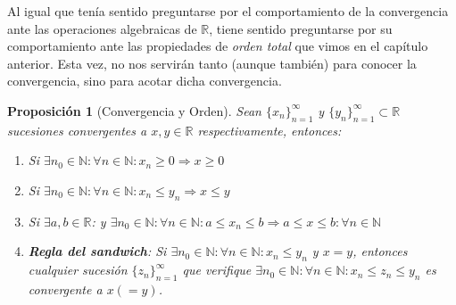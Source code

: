 \documentclass[10pt,a4paper,openright]{book}
\theoremstyle{break}
\newtheorem{prop}{Proposición}[chapter]
\begin{document}
Al igual que tenía sentido preguntarse por el comportamiento de la convergencia ante las operaciones algebraicas de $\mathbb{R}$, tiene sentido preguntarse por su comportamiento ante las propiedades de \textit{orden total} que vimos en el capítulo anterior. Esta vez, no nos servirán tanto (aunque también) para conocer la convergencia, sino para acotar dicha convergencia. 

\begin{prop}[Convergencia y Orden]
Sean $\{x_n\}_{n=1}^\infty$ y $\{y_n\}_{n=1}^\infty\subset \mathbb R$ sucesiones convergentes a $x,y\in \mathbb R$ respectivamente, entonces:
\begin{enumerate}
\item Si $\exists n_0 \in \mathbb{N}: \forall n\in \mathbb{N}: x_n\geq 0 \Rightarrow x\geq 0$
\item Si $\exists n_0 \in \mathbb{N}: \forall n\in \mathbb{N}: x_n\leq y_n \Rightarrow x\leq y$
\item Si $\exists a,b\in \mathbb R$: y $\exists n_0 \in \mathbb{N}: \forall n\in \mathbb{N}: a\leq x_n\leq b\Rightarrow a\leq x\leq b: \forall n \in \mathbb N$
\item \textbf{Regla del sandwich}: Si $\exists n_0 \in \mathbb{N}: \forall n\in \mathbb{N} : x_n\leq y_n$ y $x=y$, entonces cualquier sucesión $\{z_n\}_{n=1}^\infty $ que verifique $\exists n_0 \in \mathbb{N}: \forall n\in \mathbb{N} : x_n\leq z_n\leq y_n$ es convergente a $x(=y)$.
\end{enumerate}
\end{prop}
\end{document}
